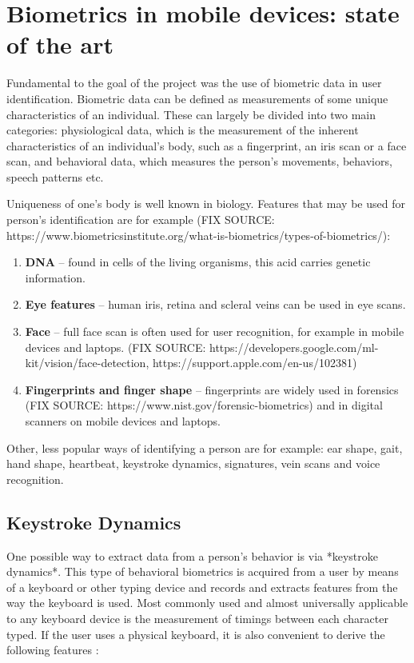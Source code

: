 
\chapter{Biometrics in mobile devices: state of the art}

Fundamental to the goal of the project was the use of biometric data in user identification. Biometric data can be defined as measurements of some unique characteristics of an individual. These can largely be divided into two main categories: physiological data, which is the measurement of the inherent characteristics of an individual's body, such as a fingerprint, an iris scan or a face scan, and behavioral data, which measures the person's movements, behaviors, speech patterns etc. \cite{Abde2023}

Uniqueness of one's body is well known in biology. Features that may be used for person's identification are for example (FIX SOURCE: https://www.biometricsinstitute.org/what-is-biometrics/types-of-biometrics/):

\begin{enumerate}
    \item \textbf{DNA} -- found in cells of the living organisms, this acid carries genetic information.
    \item \textbf{Eye features} -- human iris, retina and scleral veins can be used in eye scans.
    \item \textbf{Face} -- full face scan is often used for user recognition, for example in mobile devices and laptops. (FIX SOURCE: https://developers.google.com/ml-kit/vision/face-detection, https://support.apple.com/en-us/102381)
    \item \textbf{Fingerprints and finger shape} -- fingerprints are widely used in forensics (FIX SOURCE: https://www.nist.gov/forensic-biometrics) and in digital scanners on mobile devices and laptops.
\end{enumerate}

Other, less popular ways of identifying a person are for example: ear shape, gait, hand shape, heartbeat, keystroke dynamics, signatures, vein scans and voice recognition.

\section{Keystroke Dynamics}
One possible way to extract data from a person's behavior is via *keystroke dynamics*. This type of behavioral biometrics is acquired from a user by means of a keyboard or other typing device and records and extracts features from the way the keyboard is used. Most commonly used and almost universally applicable to any keyboard device is the measurement of timings between each character typed. If the user uses a physical keyboard, it is also convenient to derive the following features \cite{Shar2023}:

